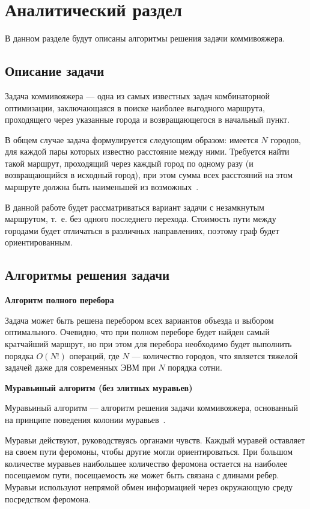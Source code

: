 \chapter{Аналитический раздел}

В данном разделе будут описаны алгоритмы решения задачи коммивояжера.

\section{Описание задачи}

Задача коммивояжера --- одна из самых известных задач комбинаторной оптимизации, заключающаяся в поиске наиболее выгодного маршрута, проходящего через указанные города и возвращающегося в начальный пункт.

В общем случае задача формулируется следующим образом: имеется $N$ городов, для каждой пары которых известно расстояние между ними. Требуется найти такой маршрут, проходящий через каждый город по одному разу (и возвращающийся в исходный город), при этом сумма всех расстояний на этом маршруте должна быть наименьшей из возможных~\cite{intro}.

В данной работе будет рассматриваться вариант задачи с незамкнутым маршрутом, т.~е. без одного последнего перехода.
Стоимость пути между городами будет отличаться в различных направлениях, поэтому граф будет ориентированным.

\section{Алгоритмы решения задачи}

\textbf{Алгоритм полного перебора}

Задача может быть решена перебором всех вариантов объезда и выбором оптимального.
Очевидно, что при полном переборе будет найден самый кратчайший маршрут, но при этом для перебора необходимо будет выполнить порядка $O(N!)$ операций, где $N$ --- количество городов, что является тяжелой задачей даже для современных ЭВМ при $N$ порядка сотни.

\textbf{Муравьиный алгоритм (без элитных муравьев)}

Муравьиный алгоритм --- алгоритм решения задачи коммивояжера, основанный на принципе поведения колонии
муравьев~\cite{ants}. 

Муравьи действуют, руководствуясь органами чувств. Каждый муравей оставляет на своем пути феромоны, чтобы другие могли ориентироваться. При большом количестве муравьев наибольшее количество феромона остается на наиболее посещаемом пути, посещаемость же может быть связана с длинами ребер. Муравьи используют непрямой обмен информацией через окружающую среду посредством феромона.

